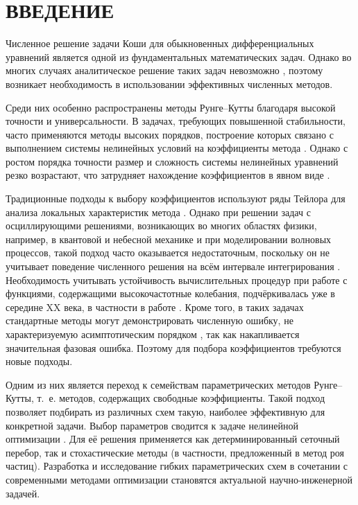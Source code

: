 \newpage
\pagestyle{plain}
\section{\centering ВВЕДЕНИЕ}
Численное решение задачи Коши для обыкновенных дифференциальных уравнений является одной из фундаментальных математических задач. Однако во многих случаях аналитическое решение таких задач невозможно \cite{Verzhbitsky2002, Butcher2008}, поэтому возникает необходимость в использовании эффективных численных методов. 

 Среди них особенно распространены методы Рунге--Кутты благодаря высокой точности и универсальности. В задачах, требующих повышенной стабильности, часто применяются методы высоких порядков, построение которых связано с выполнением системы нелинейных условий на коэффициенты метода \cite{Hairer1993}. Однако с ростом порядка точности размер и сложность системы нелинейных уравнений резко возрастают, что затрудняет нахождение коэффициентов в явном виде \cite{Demidovich2011}. 
 
Традиционные подходы к выбору коэффициентов используют ряды Тейлора для анализа локальных характеристик метода \cite{Hairer1993}. Однако при решении задач с осциллирующими решениями, возникающих во многих областях физики, например, в квантовой и небесной механике \cite{Anastassi2023, Anastassi2025} и при моделировании волновых процессов, такой подход часто оказывается недостаточным, поскольку он не учитывает поведение численного решения на всём интервале интегрирования \cite{Lambert1976}. Необходимость учитывать устойчивость вычислительных процедур при работе с функциями, содержащими высокочастотные колебания, подчёркивалась уже в середине XX века, в частности в работе \cite{Gautschi1961}. Кроме того, в таких задачах стандартные методы могут демонстрировать численную ошибку, не характеризуемую асимптотическим порядком \cite{Anastassi2023}, так как накапливается значительная фазовая ошибка. Поэтому для подбора коэффициентов требуются новые подходы.

Одним из них является переход к семействам параметрических методов Рунге--Кутты, т.~е. методов, содержащих свободные коэффициенты. Такой подход позволяет подбирать из различных схем такую, наиболее эффективную для конкретной задачи. Выбор параметров сводится к задаче нелинейной оптимизации \cite{Anastassi2023}. Для её решения применяется как детерминированный сеточный перебор, так и стохастические методы (в частности, предложенный в \cite{Anastassi2025} метод роя частиц). Разработка и исследование гибких параметрических схем в сочетании с современными методами оптимизации становятся актуальной научно-инженерной задачей.

